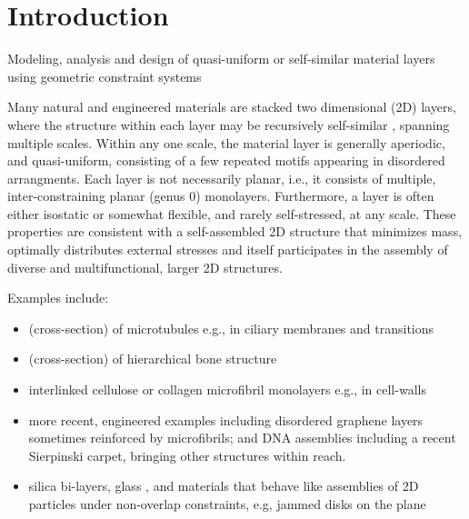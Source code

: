 \section{Introduction}
Modeling, analysis and design of quasi-uniform or self-similar material layers using geometric constraint systems
 

Many natural and engineered materials are stacked two dimensional (2D) layers, where the structure within each layer may be recursively 
self-similar \cite{Intro1}, 
spanning multiple scales. Within any one scale, the material layer is generally aperiodic, and quasi-uniform,
consisting of a few repeated motifs appearing in disordered arrangments.
Each layer is not necessarily planar, i.e., it consists of multiple, inter-constraining planar (genus 0) monolayers. 
Furthermore, a layer is often   either isostatic or somewhat flexible, and rarely self-stressed, at any scale. These properties are
consistent with a self-assembled 2D structure that minimizes mass, optimally distributes external stresses and itself 
participates in the assembly of diverse and multifunctional, 
larger 2D structures.

Examples include:

\begin{itemize}
    
    \item (cross-section) of microtubules \cite{Necklace1} e.g., in ciliary membranes and transitions \cite{Necklace2}
    
    \item (cross-section) of hierarchical bone structure \cite{XX}
    
    \item interlinked cellulose or collagen microfibril monolayers e.g., in cell-walls \cite{CellWalls1} \cite{CellWalls1}
    
    \item more recent, engineered examples including  disordered graphene layers \cite{Graphene1} \cite{Graphene2} sometimes reinforced 
    by  microfibrils; and DNA assemblies \cite{Microfibrils1} including a recent Sierpinski carpet, bringing other structures 
    \cite{Microfibrils2} within reach.
    
    \item  silica bi-layers, glass \cite{SilicaGlass1} \cite{SilicaGlass2}, and materials that behave like assemblies of 
    2D particles under non-overlap constraints, e.g, jammed 
    disks on the plane \cite{JammedDisk1}

   
\end{itemize}


